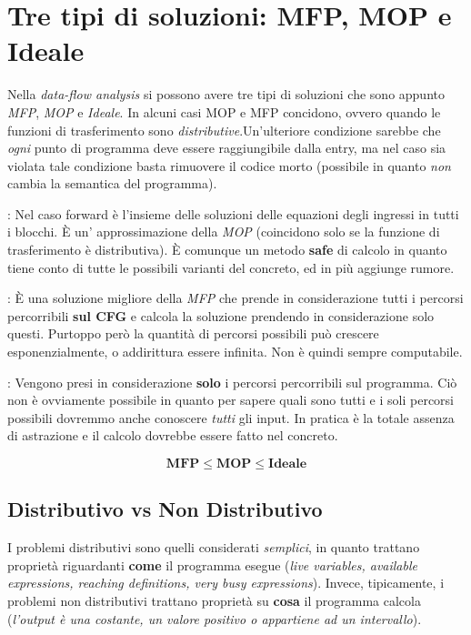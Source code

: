 \documentclass[a4paper, 10pt]{book}
\newenvironment{definition}[1][Definizione]{\begin{trivlist}
\item[\hskip \labelsep {\bfseries #1}]}{\end{trivlist}}
\begin{document}
\section{Tre tipi di soluzioni: MFP, MOP e Ideale}
Nella \emph{data-flow analysis} si possono avere tre tipi di soluzioni che sono appunto \emph{MFP}, \emph{MOP}
e \emph{Ideale}. In alcuni casi MOP e MFP concidono, ovvero quando le funzioni di trasferimento sono 
\emph{distributive}.Un'ulteriore condizione sarebbe che \emph{ogni} punto di programma deve essere 
raggiungibile dalla entry, ma nel caso sia violata tale condizione basta rimuovere il codice morto (possibile
in quanto \emph{non} cambia la semantica del programma).

\begin{definition}[MFP (maximum fixed point)]: 
    Nel caso forward è l'insieme delle soluzioni delle equazioni degli ingressi in tutti i blocchi. È un'
    approssimazione della \emph{MOP} (coincidono solo se la funzione di trasferimento è distributiva).
    È comunque un metodo \textbf{safe} di calcolo in quanto tiene conto di tutte le possibili varianti
    del concreto, ed in più aggiunge rumore.
\end{definition}

\begin{definition}[MOP (merge over all paths)]:
    È una soluzione migliore della \emph{MFP} che prende in considerazione tutti i percorsi percorribili
    \textbf{sul CFG} e calcola la soluzione prendendo in considerazione solo questi. Purtoppo però
    la quantità di percorsi possibili può crescere esponenzialmente, o addirittura essere infinita. Non è
    quindi sempre computabile.
\end{definition}

\begin{definition}[Ideale]:
    Vengono presi in considerazione \textbf{solo} i percorsi percorribili sul programma. Ciò non è ovviamente
    possibile in quanto per sapere quali sono tutti e i soli percorsi possibili dovremmo anche conoscere
    \emph{tutti} gli input. In pratica è la totale assenza di astrazione e il calcolo dovrebbe essere fatto
    nel concreto.
\end{definition}

$$\mathbf{MFP} \leq \mathbf{MOP} \leq \mathbf{Ideale}$$

\subsection{Distributivo vs Non Distributivo}
I problemi distributivi sono quelli considerati \emph{semplici}, in quanto trattano proprietà riguardanti
\textbf{come} il programma esegue (\emph{live variables, available expressions, reaching definitions, 
very busy expressions}). Invece, tipicamente, i problemi non distributivi trattano proprietà
su \textbf{cosa} il programma calcola (\emph{l'output è una costante, un valore positivo o appartiene ad
un intervallo}).
\end{document}
